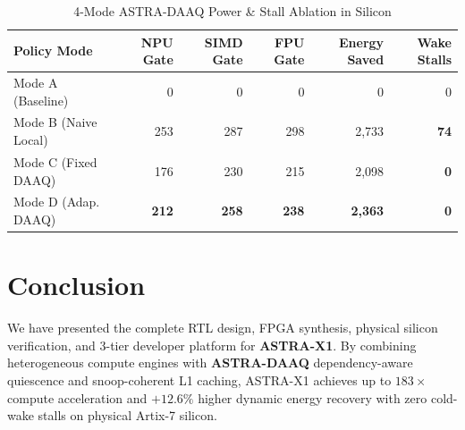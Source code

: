 \documentclass[conference]{IEEEtran}
\begin{document}
\begin{table}[htbp]
\caption{4-Mode ASTRA-DAAQ Power \& Stall Ablation in Silicon}
\begin{center}
\begin{tabular}{lrrrrr}
\toprule
\textbf{Policy Mode} & \textbf{NPU Gate} & \textbf{SIMD Gate} & \textbf{FPU Gate} & \textbf{Energy Saved} & \textbf{Wake Stalls} \\
\midrule
Mode A (Baseline) & 0 & 0 & 0 & 0 & 0 \\
Mode B (Naive Local) & 253 & 287 & 298 & 2,733 & \textbf{74} \\
Mode C (Fixed DAAQ) & 176 & 230 & 215 & 2,098 & \textbf{0} \\
Mode D (Adap. DAAQ) & \textbf{212} & \textbf{258} & \textbf{238} & \textbf{2,363} & \textbf{0} \\
\bottomrule
\end{tabular}
\end{center}
\end{table}

\section{Conclusion}
We have presented the complete RTL design, FPGA synthesis, physical silicon verification, and 3-tier developer platform for \textbf{ASTRA-X1}. By combining heterogeneous compute engines with \textbf{ASTRA-DAAQ} dependency-aware quiescence and snoop-coherent L1 caching, ASTRA-X1 achieves up to $183\times$ compute acceleration and $+12.6\%$ higher dynamic energy recovery with zero cold-wake stalls on physical Artix-7 silicon.
\end{document}
